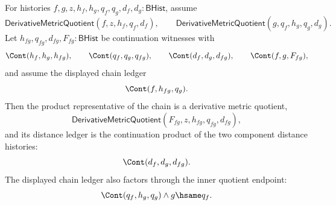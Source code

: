 \begin{theorem}
\label{thm:derivative-metric-quotient-chain-product-composition}
For histories $f,g,z,h_f,h_g,q_f,q_g,d_f,d_g:\mathsf{BHist}$, assume
$$
\mathsf{DerivativeMetricQuotient}(f,z,h_f,q_f,d_f),\qquad
\mathsf{DerivativeMetricQuotient}(g,q_f,h_g,q_g,d_g).
$$
Let $h_{fg},q_{fg},d_{fg},F_{fg}:\mathsf{BHist}$ be continuation witnesses with
$$
\Cont(h_f,h_g,h_{fg}),\qquad
\Cont(q_f,q_g,q_{fg}),\qquad
\Cont(d_f,d_g,d_{fg}),\qquad
\Cont(f,g,F_{fg}),
$$
and assume the displayed chain ledger
$$
\Cont(f,h_{fg},q_g).
$$
Then the product representative of the chain is a derivative metric quotient,
$$
\mathsf{DerivativeMetricQuotient}(F_{fg},z,h_{fg},q_{fg},d_{fg}),
$$
and its distance ledger is the continuation product of the two component
distance histories:
$$
\Cont(d_f,d_g,d_{fg}).
$$
The displayed chain ledger also factors through the inner quotient endpoint:
$$
\Cont(q_f,h_g,q_g)\land g\hsame q_f.
$$
\end{theorem}
